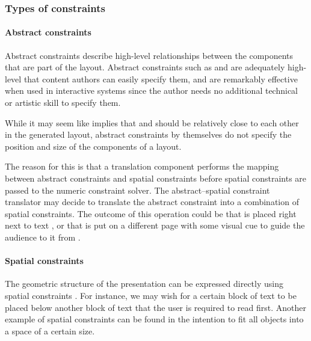     \subsubsection{Types of constraints}

     \paragraph{Abstract constraints}

      Abstract constraints describe high-level relationships between the
      components that are part of the layout. Abstract constraints such as
       and  are adequately
      high-level that content authors can easily specify them, and are
      remarkably effective when used in interactive systems since the author
      needs no additional technical or artistic skill to specify them.

      While it may seem like  implies that
       and  should be relatively close to each other in
      the generated layout, abstract constraints by themselves do not specify
      the position and size of the components of a layout.
     
      The reason for this is that a translation component performs the mapping
      between abstract constraints and spatial constraints before spatial
      constraints are passed to the numeric constraint solver. The
      abstract–spatial constraint translator may decide to translate the
      abstract constraint  into a combination of spatial
      constraints. The outcome of this operation could be that  is placed
      right next to text , or that  is put on a different page with
      some visual cue to guide the audience to it from .

     \paragraph{Spatial constraints}
      \label{spatialcon}

      The geometric structure of the presentation can be expressed directly
      using spatial constraints . For instance, we may wish for a certain block
      of text to be placed below another block of text that the user is
      required to read first. Another example of spatial constraints can be
      found in the intention to fit all objects into a space of a certain size.

